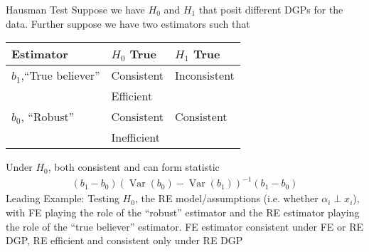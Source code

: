 \documentclass[aspectratio=169, handout]{beamer}
\newcommand{\Var}{\operatorname{Var}}
\begin{document}
{\footnotesize
\begin{frame}{Hausman Test}
Suppose we have $H_0$ and $H_1$ that posit different DGPs for the data.
Further suppose we have two estimators such that
\begin{table}[htbp!]
\centering
\begin{tabular}{l|ll}
  Estimator & $H_0$ True & $H_1$ True \\\hline\hline
  $b_1$,``True believer'' & Consistent & Inconsistent \\
   & Efficient &
  \\\hline
  $b_0$, ``Robust'' & Consistent & Consistent \\
  & Inefficient
\end{tabular}
\end{table}
Under $H_0$, both consistent and can form statistic
\begin{align*}
  (b_1-b_0)(\Var(b_0)-\Var(b_1))^{-1}(b_1-b_0)
\end{align*}
\alert{Leading Example}:
Testing $H_0$, the RE model/assumptions (i.e. whether $\alpha_i\perp
x_i$), with FE playing the role of the ``robust'' estimator and the RE
estimator playing the role of the ``true believer'' estimator.
FE estimator consistent under FE or RE DGP, RE efficient and
consistent only under RE DGP
\end{frame}
}
\end{document}
